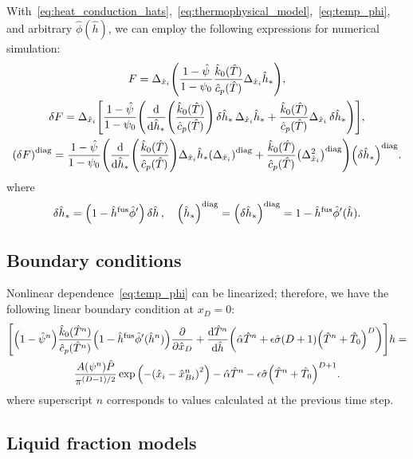 \documentclass{article}
\newcommand{\dder}[2][]{\Delta_{#2}#1}
\newcommand{\diag}[1]{\qty(#1)^\mathrm{diag}}
\newcommand{\fusion}[1]{{#1}^\mathrm{fus}}
\begin{document}
With~\eqref{eq:heat_conduction_hats},~\eqref{eq:thermophysical_model},~\eqref{eq:temp_phi},
and arbitrary \(\hat{\phi}(\hat{h})\), we can employ the following expressions for numerical simulation:
\begin{gather}
    F = \dder{\hat{x}_i}\qty(
        \frac{1 - \hat{\psi}}{1 - \psi_0}
	    \frac{\hat{k}_0(\hat{T})}{\hat{c}_p(\hat{T})}
	    \dder[\hat{h}_*]{\hat{x}_i}
	), \\
    \var{F} = \dder{\hat{x}_i}\qty[ \frac{1 - \hat{\psi}}{1 - \psi_0} \qty(
	    \dv{\hat{h}_*}(\frac{\hat{k}_0(\hat{T})}{\hat{c}_p(\hat{T})})\var{\hat{h}_*}\dder[\hat{h}_*]{\hat{x}_i}
	    +
	    \frac{\hat{k}_0(\hat{T})}{\hat{c}_p(\hat{T})}
	    \dder[\var{\hat{h}_*}]{\hat{x}_i}
	)], \\
    \diag{\var{F}} = \frac{1 - \hat{\psi}}{1 - \psi_0} \qty(
	    \dv{\hat{h}_*}(\frac{\hat{k}_0(\hat{T})}{\hat{c}_p(\hat{T})})\dder[\hat{h}_*]{\hat{x}_i} \diag{\dder{\hat{x}_i}}
	    +
	    \frac{\hat{k}_0(\hat{T})}{\hat{c}_p(\hat{T})}
	    \diag{\dder{\hat{x}_i}^2}
	)\diag{\var{\hat{h}_*}}.
\end{gather}
where
\begin{equation}
    \var{\hat{h}_*} = \qty(1 - \fusion{\hat{h}}\hat\phi')\var{\hat{h}}, \quad
    \diag{\hat{h}_*} = \diag{\var{\hat{h}_*}} = 1 - \fusion{\hat{h}}\hat\phi'(\hat{h}).
\end{equation}

\subsection{Boundary conditions}

Nonlinear dependence~\eqref{eq:temp_phi} can be linearized; therefore, we have the following linear boundary condition at \(x_D=0\):
\begin{multline}\label{eq:bc_linearized}
	\qty[
	    \qty(1 - \hat{\psi}^n) \frac{\hat{k}_0(\hat{T}^n)}{\hat{c}_p(\hat{T}^n)}
	    \qty(1-\fusion{\hat{h}}\hat\phi'(\hat{h}^n))\pdv{\hat{x}_D} +
	    \dv{\hat{T}^n}{\hat{h}}\qty(
	        \hat{\alpha}\hat{T}^n + \epsilon\hat{\sigma}(D+1)\qty(\hat{T}^n + \hat{T}_0)^D)
	]h = \\ \frac{A(\psi^n)\hat{P}}{\pi^{(D-1)/2}}\exp\qty( -\qty(\hat{x}_i-\hat{x}_{Bi}^n)^2 ) -
        \hat{\alpha}\hat{T}^n - \epsilon\hat{\sigma}\qty(\hat{T}^n + \hat{T}_0)^{D+1}.
\end{multline}
where superscript \(n\) corresponds to values calculated at the previous time step.

\subsection{Liquid fraction models}
\end{document}
